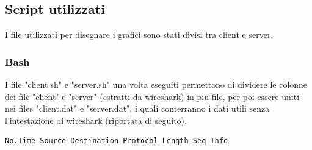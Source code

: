 \documentclass[12pt]{article}
\begin{document}
\subsection{Script utilizzati}
I file utilizzati per disegnare i grafici sono stati divisi tra client e server.
\subsubsection{Bash}
I file "client.sh" e "server.sh" una volta eseguiti permettono di dividere le colonne dei file "client" e "server" (estratti da wireshark) in piu file,
per poi essere uniti nei files "client.dat" e "server.dat", i quali conterranno i dati utili senza l'intestazione di wireshark (riportata di seguito).

\begin{verbatim}
No.Time Source Destination Protocol Length Seq Info
\end{verbatim}
\end{document}
